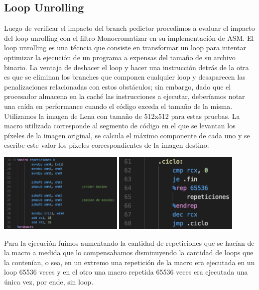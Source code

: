\newpage
\subsection{Loop Unrolling}

Luego de verificar el impacto del branch pedictor procedimos a evaluar el impacto del loop unrolling con el filtro Monocromatizar en su implementación de ASM. El loop unrolling es una técncia que consiste en transformar un loop para intentar optimizar la ejecución de un programa a expensas del tamaño de su archivo binario. La ventaja de deshacer el loop y hacer una instrucción detrás de la otra es que se eliminan los branches que componen cualquier loop y desaparecen las penalizaciones relacionadas con estos obstáculos; sin embargo, dado que el procesador almacena en la caché las instrucciones a ejecutar, deberíamos notar una caída en performance cuando el código exceda el tamaño de la misma. Utilizamos la imagen de Lena con tamaño de 512x512 para estas pruebas. La macro utilizada corresponde al segmento de código en el que se levantan los píxeles de la imagen original, se calcula el máximo componente de cada uno y se escribe este valor los píxeles correspondientes de la imagen destino:

\begin{center}

	\includegraphics[width=0.45\textwidth]{imagenes/loopunrolling/macro.png}
	\includegraphics[width=0.45\textwidth]{imagenes/loopunrolling/reps.png}

\end{center}

Para la ejecución fuimos aumentando la cantidad de repeticiones que se hacían de la macro a medida que lo compensabamos disminuyendo la cantidad de loops que la contenían, o sea, en un extremo una repetición de la macro era ejecutada en un loop 65536 veces y en el otro una macro repetida 65536 veces era ejecutada una única vez, por ende, sin loop.

